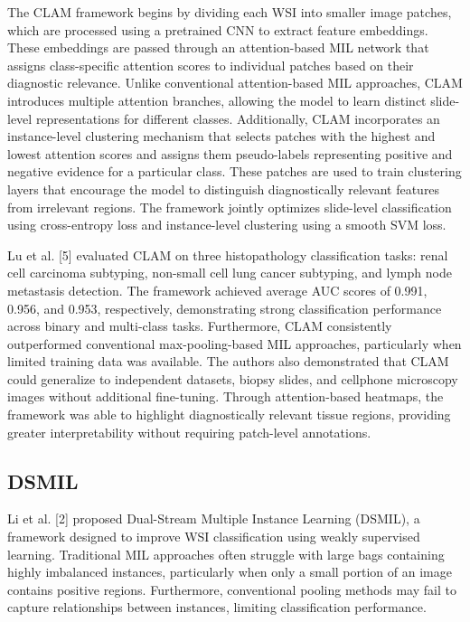 \documentclass[journal]{IEEEtran}
\begin{document}
The CLAM framework begins by dividing each WSI into smaller image patches, which are processed using a pretrained CNN to extract feature embeddings. These embeddings are passed through an attention-based MIL network that assigns class-specific attention scores to individual patches based on their diagnostic relevance. Unlike conventional attention-based MIL approaches, CLAM introduces multiple attention branches, allowing the model to learn distinct slide-level representations for different classes. Additionally, CLAM incorporates an instance-level clustering mechanism that selects patches with the highest and lowest attention scores and assigns them pseudo-labels representing positive and negative evidence for a particular class. These patches are used to train clustering layers that encourage the model to distinguish diagnostically relevant features from irrelevant regions. The framework jointly optimizes slide-level classification using cross-entropy loss and instance-level clustering using a smooth SVM loss.

Lu et al. [5] evaluated CLAM on three histopathology classification tasks: renal cell carcinoma subtyping, non-small cell lung cancer subtyping, and lymph node metastasis detection. The framework achieved average AUC scores of 0.991, 0.956, and 0.953, respectively, demonstrating strong classification performance across binary and multi-class tasks. Furthermore, CLAM consistently outperformed conventional max-pooling-based MIL approaches, particularly when limited training data was available. The authors also demonstrated that CLAM could generalize to independent datasets, biopsy slides, and cellphone microscopy images without additional fine-tuning. Through attention-based heatmaps, the framework was able to highlight diagnostically relevant tissue regions, providing greater interpretability without requiring patch-level annotations.

\subsection{DSMIL}
Li et al. [2] proposed Dual-Stream Multiple Instance Learning (DSMIL), a framework designed to improve WSI classification using weakly supervised learning. Traditional MIL approaches often struggle with large bags containing highly imbalanced instances, particularly when only a small portion of an image contains positive regions. Furthermore, conventional pooling methods may fail to capture relationships between instances, limiting classification performance.
\end{document}
